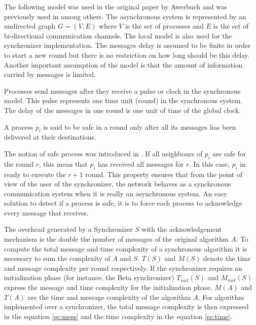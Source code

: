 The following model was used in the original paper by Awerbuch \cite{awerbuch1985complexity} and was previously used in \cite{segall1983distributed,gallager1982distributed} among others. The asynchronous system is represented by an undirected graph $G = (V,E)$ where $V$ is the set of processes and $E$ is the set of bi-directional communication channels. The local model is also used for the synchronizer implementation. The messages delay is assumed to be finite in order to start a new round but there is no restriction on how long should be this delay. Another important assumption of the model is that the amount of information carried by messages is limited. 

Processes send messages after they receive a pulse or clock in the synchronous model. This pulse represents one time unit (round) in the synchronous system. The delay of the messages in one round is one unit of time of the global clock.

\begin{definition}
\label{def:safe}
A process $p_i$ is said to be safe in a round only after all its messages has been delivered at their destinations.
\end{definition}

The notion of safe process was introduced in \cite{awerbuch1985complexity}. If all neighbours of $p_i$ are safe for the round $r$, this mean that $p_i$ has received all messages for $r$. In this case, $p_i$ in ready to execute the $r + 1$ round. This property ensures that from the point of view of the user of the synchronizer, the network behaves as a synchronous communication system when it is really an asynchronous system. An easy solution to detect if a process is safe, it is to force each process to acknowledge every message that receives. 

The  overhead generated by a Synchronizer $S$ with the acknowledgement mechanism is the double the number of messages of the original algorithm $A$. To compute the total message and time complexity of a synchronous algorithm it is necessary to sum the complexity of $A$ and $S$. $T(S)$ and $M(S)$ denote the time and message complexity per round respectively. If the synchronizer requires an initialization phase (for instance, the Beta synchronizer) $T_{init}(S)$ and $M_{init}(S)$ express the message and time complexity for the initialization phase.  $M(A)$ and $T(A)$ are  the time and message complexity of the algorithm $A$. For algorithm implemented over a synchronizer, the total message complexity is then expressed in the equation \ref{ec:mess} and the time complexity in the equation \ref{ec:time}. 


